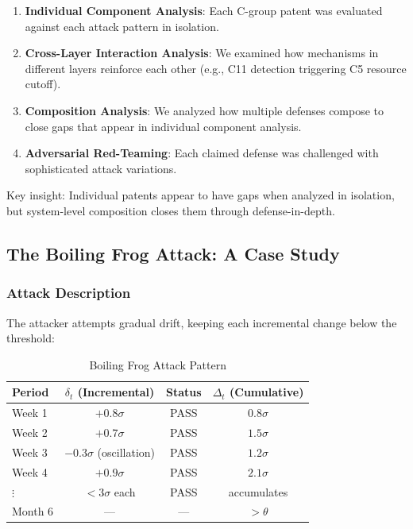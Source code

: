 \documentclass[11pt,a4paper]{article}
\begin{document}
\begin{enumerate}
    \item \textbf{Individual Component Analysis}: Each C-group patent was evaluated against each attack pattern in isolation.
    \item \textbf{Cross-Layer Interaction Analysis}: We examined how mechanisms in different layers reinforce each other (e.g., C11 detection triggering C5 resource cutoff).
    \item \textbf{Composition Analysis}: We analyzed how multiple defenses compose to close gaps that appear in individual component analysis.
    \item \textbf{Adversarial Red-Teaming}: Each claimed defense was challenged with sophisticated attack variations.
\end{enumerate}

Key insight: Individual patents appear to have gaps when analyzed in isolation, but system-level composition closes them through defense-in-depth.

\subsection{The Boiling Frog Attack: A Case Study}

\subsubsection{Attack Description}

The attacker attempts gradual drift, keeping each incremental change below the threshold:

\begin{table}[htbp]
\centering
\caption{Boiling Frog Attack Pattern}
\label{tab:boiling_frog}
\begin{tabular}{@{}lccc@{}}
\toprule
Period & $\delta_t$ (Incremental) & Status & $\Delta_t$ (Cumulative) \\
\midrule
Week 1 & $+0.8\sigma$ & PASS & $0.8\sigma$ \\
Week 2 & $+0.7\sigma$ & PASS & $1.5\sigma$ \\
Week 3 & $-0.3\sigma$ (oscillation) & PASS & $1.2\sigma$ \\
Week 4 & $+0.9\sigma$ & PASS & $2.1\sigma$ \\
$\vdots$ & $< 3\sigma$ each & PASS & accumulates \\
Month 6 & --- & --- & $> \theta$ \\
\bottomrule
\end{tabular}
\end{table}
\end{document}
